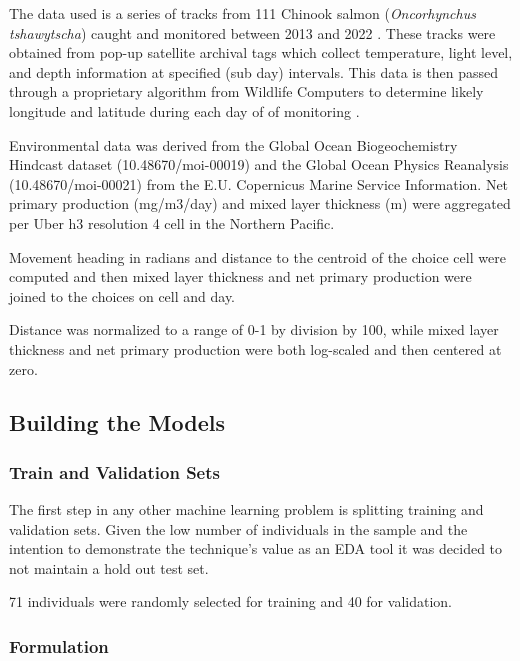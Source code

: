 \documentclass[11pt]{article}
\begin{document}
The data used is a series of tracks from 111 Chinook salmon (\textit{Oncorhynchus tshawytscha}) caught and monitored between 2013 and 2022 \citep{tags1} \citep{tags2}. These tracks were obtained from pop-up satellite archival tags which collect temperature, light level, and depth information at specified (sub day) intervals. This data is then passed through a proprietary algorithm from Wildlife Computers to determine likely longitude and latitude during each day of of monitoring \citep{PSAT}. \newline

Environmental data was derived from the Global Ocean Biogeochemistry Hindcast dataset (10.48670/moi-00019) and the Global Ocean Physics Reanalysis (10.48670/moi-00021) from the E.U. Copernicus Marine Service Information. Net primary production (mg/m3/day) and mixed layer thickness (m) were aggregated per Uber h3 resolution 4 cell in the Northern Pacific. \newline

Movement heading in radians and distance to the centroid of the choice cell were computed and then mixed layer thickness and net primary production were joined to the choices on cell and day.

Distance was normalized to a range of 0-1 by division by 100, while mixed layer thickness and net primary production were both log-scaled and then centered at zero. 

\subsection*{Building the Models}

\subsubsection*{Train and Validation Sets} 

The first step in any other machine learning problem is splitting training and validation sets. Given the low number of individuals in the sample and the intention to demonstrate the technique's value as an EDA tool it was decided to not maintain a hold out test set.

71 individuals were randomly selected for training and 40 for validation.

\subsubsection*{Formulation}
\end{document}
